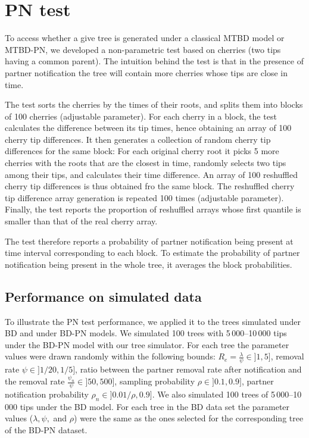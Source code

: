 \documentclass[a4paper,10pt]{article}
\begin{document}
\section{PN test}
To access whether a give tree is generated under a classical MTBD model or MTBD-PN, we developed a non-parametric test based on cherries (two tips having a common parent). 
The intuition behind the test is that in the presence of partner notification the tree will contain more cherries whose tips are close in time. 

The test sorts the cherries by the times of their roots, and splits them into blocks of 100 cherries (adjustable parameter). For each cherry in a block, the test calculates the difference between its tip times, hence obtaining an array of 100 cherry tip differences. It then generates a collection of random cherry tip differences for the same block: For each original cherry root it picks 5 more cherries with the roots that are the closest in time, randomly selects two tips among their tips, and calculates their time difference. An array of 100 reshuffled cherry tip differences is thus obtained fro the same block. The reshuffled cherry tip difference array generation is repeated 100 times (adjustable parameter). Finally, the test reports the proportion of reshuffled arrays whose first quantile is smaller than that of the real cherry array. 

The test therefore reports a probability of partner notification being present at time interval corresponding to each block. To estimate the probability of partner notification being present in the whole tree, it averages the block probabilities. 


\subsection{Performance on simulated data}
To illustrate the PN test performance, we applied it to the trees simulated under BD and under BD-PN models. We simulated 100 trees with 5\,000--10\,000 tips under the BD-PN model with our tree simulator. For each tree the parameter values were drawn randomly within the following bounds:
$R_e = \frac{{\lambda}}{{\psi}} \in ]1, 5]$, 
removal rate $\psi \in ]1 / 20, 1 / 5]$,
ratio between the partner removal rate after notification and the removal rate $\frac{\psi_n}{\psi} \in ]50, 500]$,
sampling probability $\rho \in ]0.1, 0.9]$,
partner notification probability $\rho_n \in ]0.01/\rho, 0.9]$. We also simulated 100 trees of 5\,000--10\,000 tips under the BD model. For each tree in the BD data set the parameter values ($\lambda, \psi,$ and $\rho$) were the same as the ones selected for the corresponding tree of the BD-PN dataset.
\end{document}
